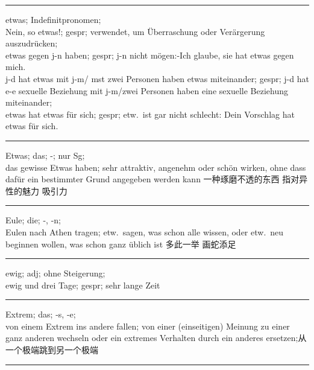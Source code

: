 \noindent\rule{\textwidth}{1pt}
etwas; Indefinitpronomen;\\
Nein, so etwas!; gespr; verwendet, um \"Uberraschung oder Ver\"argerung auszudr\"ucken;\\
etwas gegen j-n haben; gespr; j-n nicht m\"ogen:-Ich glaube, sie hat etwas gegen mich. \\
j-d hat etwas mit j-m/ mst zwei Personen haben etwas miteinander; gespr; j-d hat e-e sexuelle Beziehung mit j-m/zwei Personen haben eine sexuelle Beziehung miteinander;\\
etwas hat etwas f\"ur sich; gespr; etw.\ ist gar nicht schlecht: Dein Vorschlag hat etwas f\"ur sich. \\

\noindent\rule{\textwidth}{1pt}
Etwas; das; -; nur Sg;\\
das gewisse Etwas haben; sehr attraktiv, angenehm oder sch\"on wirken, ohne dass daf\"ur ein bestimmter Grund angegeben werden kann 一种琢磨不透的东西 指对异性的魅力 吸引力

\noindent\rule{\textwidth}{1pt}
Eule; die; -, -n; \\
Eulen nach Athen tragen; etw.\ sagen, was schon alle wissen, oder etw.\ neu beginnen wollen, was schon ganz \"ublich ist 多此一举 画蛇添足\\

\noindent\rule{\textwidth}{1pt}
ewig; adj; ohne Steigerung;\\
ewig und drei Tage; gespr; sehr lange Zeit\\

\noindent\rule{\textwidth}{1pt}
Extrem; das; -s, -e;\\
von einem Extrem ins andere fallen; von einer (einseitigen) Meinung zu einer ganz anderen wechseln oder ein extremes Verhalten durch ein anderes ersetzen;从一个极端跳到另一个极端\\

\noindent\rule{\textwidth}{1pt}
